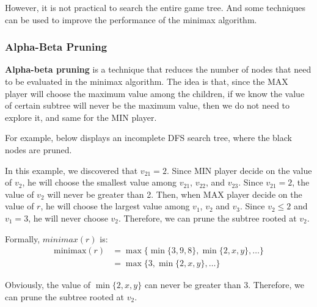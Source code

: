 \documentclass[a4paper,12pt]{article}
\begin{document}
However, it is not practical to search the entire game tree. And some techniques can be used to improve the performance of the minimax algorithm.

\subsubsection{Alpha-Beta Pruning}

\textbf{Alpha-beta pruning} is a technique that reduces the number of nodes that need to be evaluated in the minimax algorithm. The idea is that, since the MAX player will choose the maximum value among the children, if we know the value of certain subtree will never be the maximum value, then we do not need to explore it, and same for the MIN player.

For example, below displays an incomplete DFS search tree, where the black nodes are pruned.
\begin{figure}[H]
  \centering
\end{figure}

In this example, we discovered that $v_{21} = 2$. Since MIN player decide on the value of $v_2$, he will choose the smallest value among $v_{21}$, $v_{22}$, and $v_{23}$. Since $v_{21} = 2$, the value of $v_2$ will never be greater than 2. Then, when MAX player decide on the value of $r$, he will choose the largest value among $v_1$, $v_2$ and $v_3$. Since $v_2 \leq 2$ and $v_1 = 3$, he will never choose $v_2$. Therefore, we can prune the subtree rooted at $v_2$.

\begin{tipsbox}
  Formally, $minimax(r)$ is:
  \begin{align*}
    \text{minimax}(r) &= \max\{\min\{3, 9, 8\}, \min\{2, x, y\}, \ldots\} \\
    &= \max\{3, \min\{2, x, y\}, \ldots\}
  \end{align*}

  Obviously, the value of $\min\{2, x, y\}$ can never be greater than 3. Therefore, we can prune the subtree rooted at $v_2$.
\end{tipsbox}
\end{document}
